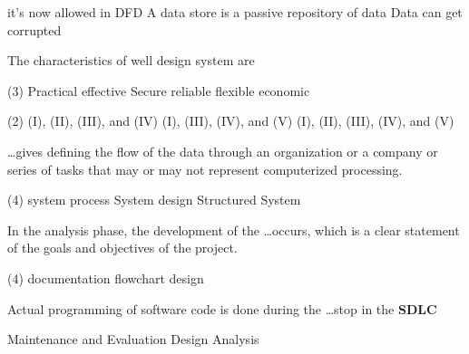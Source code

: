 \documentclass{article}
\begin{document}
\begin{questions}
\begin{exercise}
\begin{choice}
            \choice it's now allowed in DFD
            \choice A data store is a passive repository of data
            \choice Data can get corrupted
            \choice {}
        \end{choice}
    \end{exercise}
    \begin{exercise}
        The characteristics of well design system are
        \begin{tasks}(3)
            \task Practical
            \task effective
            \task Secure
            \task reliable
            \task flexible
            \task economic
        \end{tasks}
        \begin{choice}(2)
            \choice (I), (II), (III), and (IV)
            \choice (I), (III), (IV), and (V)
            \choice (I), (II), (III), (IV), and (V)
            \choice {}
        \end{choice}
    \end{exercise}
    \begin{exercise}
        \dots gives defining the flow of the data through an organization or a company or series of tasks that may or may not represent computerized processing.
        \begin{choice}(4)
            \choice system process
            \choice {}
            \choice System design
            \choice Structured System
        \end{choice}
    \end{exercise}
    \begin{exercise}
        In the analysis phase, the development of the \dots occurs, which is a clear statement of the goals and objectives of the project.
        \begin{choice}(4)
            \choice documentation
            \choice flowchart
            \choice {}
            \choice design
        \end{choice}
    \end{exercise}
    \begin{exercise}
        Actual programming of software code is done during the \dots stop in the \textbf{SDLC}
        \begin{choice}
            \choice Maintenance and Evaluation
            \choice Design
            \choice Analysis
            \choice {}
        \end{choice}

\end{exercise}
\end{questions}
\end{document}
